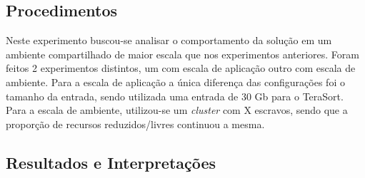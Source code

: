 \subsection{Procedimentos}
Neste experimento buscou-se analisar o comportamento da solução em um ambiente compartilhado de maior escala que nos experimentos anteriores. Foram feitos 2 experimentos distintos, um com escala de aplicação outro com escala de ambiente. Para a escala de aplicação a única diferença das configurações foi o tamanho da entrada, sendo utilizada uma entrada de 30 Gb para o TeraSort. Para a escala de ambiente, utilizou-se um \textit{cluster} com X escravos, sendo que a proporção de recursos reduzidos/livres continuou a mesma. 

\subsection{Resultados e Interpretações}

